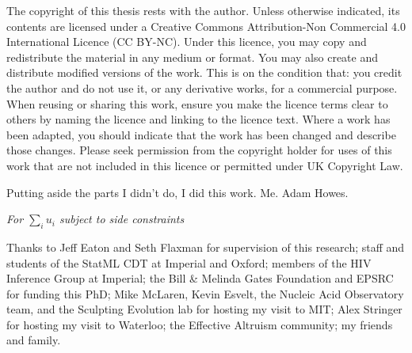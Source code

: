\documentclass[a4paper, nobind]{templates/ociamthesis}
\begin{document}
\setcounter{secnumdepth}{2}
\setcounter{tocdepth}{1}



\begin{romanpages}

\maketitle

\begin{copyrights}
  The copyright of this thesis rests with the author. Unless otherwise indicated, its contents are licensed under a Creative Commons Attribution-Non Commercial 4.0 International Licence (CC BY-NC).
  Under this licence, you may copy and redistribute the material in any medium or format. You may also create and distribute modified versions of the work.
  This is on the condition that: you credit the author and do not use it, or any derivative works, for a commercial purpose.
  When reusing or sharing this work, ensure you make the licence terms clear to others by naming the licence and linking to the licence text.
  Where a work has been adapted, you should indicate that the work has been changed and describe those changes.
  Please seek permission from the copyright holder for uses of this work that are not included in this licence or permitted under UK Copyright Law.
\end{copyrights}

\begin{originality}
  Putting aside the parts I didn't do, I did this work.
  Me.
  Adam Howes.
\end{originality}

\begin{dedication}
  \textit{For $\sum_i u_i$ subject to side constraints}
\end{dedication}

\begin{acknowledgements}
 	Thanks to Jeff Eaton and Seth Flaxman for supervision of this research;
 staff and students of the StatML CDT at Imperial and Oxford;
 members of the HIV Inference Group at Imperial;
 the Bill \& Melinda Gates Foundation and EPSRC for funding this PhD;
 Mike McLaren, Kevin Esvelt, the Nucleic Acid Observatory team, and the Sculpting Evolution lab for hosting my visit to MIT;
 Alex Stringer for hosting my visit to Waterloo;
 the Effective Altruism community;
 my friends and family.


\end{acknowledgements}
\end{romanpages}
\end{document}
